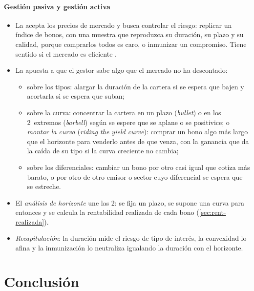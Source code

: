\documentclass[11pt]{article}
\begin{document}
\paragraph{Gestión pasiva y gestión activa}\label{sec:gestion-activa}

\begin{itemize}
\item La  acepta los precios de mercado y busca controlar el riesgo: replicar un índice de bonos, con una muestra que reproduzca su duración, su plazo y su calidad, porque comprarlos todos es caro, o inmunizar un compromiso\nocite{BodieKaneMarcus2021Investments}. Tiene sentido si el mercado es eficiente .
\item La  apuesta a que el gestor sabe algo que el mercado no ha descontado\nocite{HomerLiebowitz1972Inside}:
  \begin{itemize}
  \item sobre los tipos: alargar la duración de la cartera si se espera que bajen y acortarla si se espera que suban;
  \item sobre la curva: concentrar la cartera en un plazo (\emph{bullet}) o en los 2~extremos (\emph{barbell}) según se espere que se aplane o se positivice; o \emph{montar la curva} (\emph{riding the yield curve}): comprar un bono algo más largo que el horizonte para venderlo antes de que venza, con la ganancia que da la caída de su tipo si la curva creciente no cambia;
  \item sobre los diferenciales: cambiar un bono por otro casi igual que cotiza más barato, o por otro de otro emisor o sector cuyo diferencial se espera que se estreche.
  \end{itemize}
\item El \emph{análisis de horizonte} une las 2: se fija un plazo, se supone una curva para entonces y se calcula la rentabilidad realizada de cada bono (\ref{sec:rent-realizada}).
\item \emph{Recapitulación}: la duración mide el riesgo de tipo de interés, la convexidad lo afina y la inmunización lo neutraliza igualando la duración con el horizonte.
\end{itemize}

\section*{Conclusión}
\end{document}
